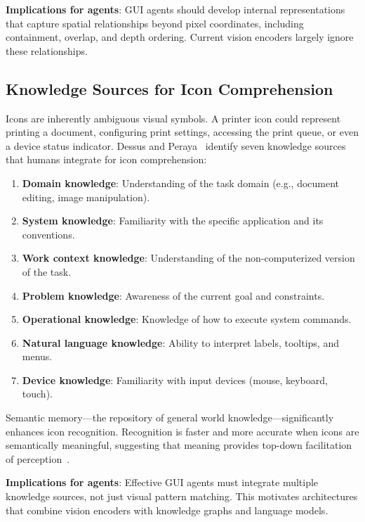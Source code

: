 \documentclass[11pt]{article}
\begin{document}
\textbf{Implications for agents}: GUI agents should develop internal representations that capture spatial relationships beyond pixel coordinates, including containment, overlap, and depth ordering. Current vision encoders largely ignore these relationships.

\subsection{Knowledge Sources for Icon Comprehension}

Icons are inherently ambiguous visual symbols. A printer icon could represent printing a document, configuring print settings, accessing the print queue, or even a device status indicator. Dessus and Peraya~\cite{dessus2000} identify seven knowledge sources that humans integrate for icon comprehension:

\begin{enumerate}
    \item \textbf{Domain knowledge}: Understanding of the task domain (e.g., document editing, image manipulation).
    \item \textbf{System knowledge}: Familiarity with the specific application and its conventions.
    \item \textbf{Work context knowledge}: Understanding of the non-computerized version of the task.
    \item \textbf{Problem knowledge}: Awareness of the current goal and constraints.
    \item \textbf{Operational knowledge}: Knowledge of how to execute system commands.
    \item \textbf{Natural language knowledge}: Ability to interpret labels, tooltips, and menus.
    \item \textbf{Device knowledge}: Familiarity with input devices (mouse, keyboard, touch).
\end{enumerate}

Semantic memory---the repository of general world knowledge---significantly enhances icon recognition. Recognition is faster and more accurate when icons are semantically meaningful, suggesting that meaning provides top-down facilitation of perception~\cite{iconcomplex2020}.

\textbf{Implications for agents}: Effective GUI agents must integrate multiple knowledge sources, not just visual pattern matching. This motivates architectures that combine vision encoders with knowledge graphs and language models.
\end{document}

